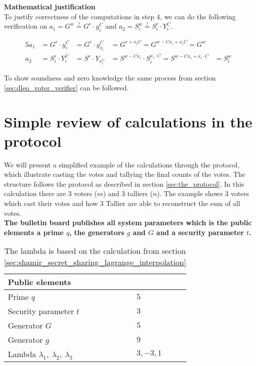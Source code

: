  \noindent
\textbf{Mathematical justification}\\
To justify correctness of the computations in step 4, we can do the following verification on \begin{math}a_1=G^w \stackrel{?}{=} G^r \cdot y_i^C\end{math} and \begin{math}a_2=S_i^w \stackrel{?}{=} S_i^r \cdot Y_i^C\end{math}.


\begin{alignat*}{5}
a_1 &=G^r \cdot y_i^C &=G^r \cdot y_{x_i}^C &=G^{r+x_iC} =G^{w-Cx_i+x_iC} =G^w\\
a_2 &= S_i^r \cdot Y_i^C &=S^r \cdot Y_{x_i^C} &=S^{w-Cx_i} \cdot S_i^{x_i \cdot C} =S^{w-Cx_i+x_i \cdot C}&=S_i^w
\end{alignat*}



\noindent
To show soundness and zero knowledge the same process from section \ref{sec:dleq_voter_verifier} can be followed.



\chapter{Simple review of calculations in the protocol}
\label{sec:simple_review_of_calculations_in_the_protocol}
We will present a simplified example of the calculations through the protocol, which illustrate casting the votes and tallying the final counts of the votes. The structure follows the protocol as described in section \ref{sec:the_protocol}. In this calculation there are $3$ voters ($m$) and $3$ talliers ($n$). The example shows  3 voters which cast their votes and how 3 Tallier are able to reconstruct the sum of all votes.\\

\noindent
\textbf{The bulletin board publishes all system parameters which is the public elements a prime $q$,  the generators $g$ and $G$ and a security parameter $t$.}


\begin{table}[H]
\centering
\begin{tabular}{|l|l|}
\hline
\multicolumn{2}{|l|}{\textbf{Public elements}} \\ \hline
Prime $q$                       & $5$              \\ \hline
Security parameter $t$          & $3$              \\ \hline
Generator $G$                   & $5$              \\ \hline
Generator $g$                   & $9$              \\ \hline
Lambda  $\lambda_1, \ \lambda_2,\ \lambda_3$                      & $3,-3,1$         \\ \hline
\end{tabular}
\caption{The lambda is based on the calculation from section \ref{sec:shamir_secret_sharing_lagrange_interpolation} }
\label{my-label}
\end{table}

